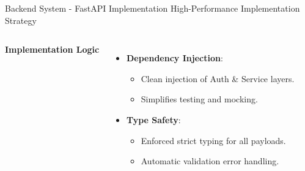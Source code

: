 \documentclass[aspectratio=169, 10pt, xcolor=table]{beamer}
\begin{document}
\begin{frame}[fragile]{Backend System - FastAPI Implementation}
    {High-Performance Implementation Strategy}
    
    \begin{columns}[t]

            \pause
            \textbf{Implementation Logic}
            \vspace{0.3em}
            \begin{itemize}
                \item \textbf{Dependency Injection}:
                \begin{itemize}
                    \item Clean injection of Auth & Service layers.
                    \item Simplifies testing and mocking.
                \end{itemize}
                \item \textbf{Type Safety}:
                \begin{itemize}
                    \item Enforced strict typing for all payloads.
                    \item Automatic validation error handling.
                \end{itemize}
            \end{itemize}
            \vspace{0.5em}
    \end{columns}
\end{frame}
\end{document}
